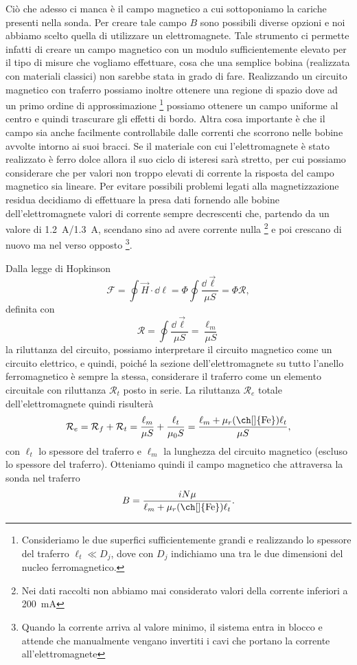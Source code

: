 \documentclass[
    prl,
    reprint, 
    superscriptaddress, 
    altaffilletter, 
    amsmath, 
    amssymb, 
    a4paper,
    varvw]{revtex4-2}
\begin{document}
Ciò che adesso ci manca è il campo magnetico a cui sottoponiamo la cariche presenti nella sonda. Per creare tale campo $B$ sono possibili diverse opzioni e noi abbiamo scelto quella di utilizzare un elettromagnete. Tale strumento ci permette infatti di creare un campo magnetico con un modulo sufficientemente elevato per il tipo di misure che vogliamo effettuare, cosa che una semplice bobina (realizzata con materiali classici) non sarebbe stata in grado di fare. Realizzando un circuito magnetico con traferro possiamo inoltre ottenere una regione di spazio dove ad un primo ordine di approssimazione \footnote{Consideriamo le due superfici sufficientemente grandi e realizzando lo spessore del traferro $\ell_t\ll D_j$, dove con $D_j$ indichiamo una tra le due dimensioni del nucleo ferromagnetico.} possiamo ottenere un campo uniforme al centro e quindi trascurare gli effetti di bordo.  Altra cosa importante è che il campo sia anche facilmente controllabile dalle correnti che scorrono nelle bobine avvolte intorno ai suoi bracci. Se il materiale con cui l'elettromagnete è stato realizzato è ferro dolce allora il suo ciclo di isteresi sarà stretto, per cui possiamo considerare che per valori non troppo elevati di corrente la risposta del campo magnetico sia lineare. Per evitare possibili problemi legati alla magnetizzazione residua decidiamo di effettuare la presa dati fornendo alle bobine dell'elettromagnete valori di corrente sempre decrescenti che, partendo da un valore di \SI{1.2}{\ampere}/\SI{1.3}{\ampere}, scendano sino ad avere corrente nulla \footnote{Nei dati raccolti non abbiamo mai considerato valori della corrente inferiori a \SI{200}{\milli\ampere}} e poi crescano di nuovo ma nel verso opposto \footnote{Quando la corrente arriva al valore minimo, il sistema entra in blocco e attende che manualmente vengano invertiti i cavi che portano la corrente all'elettromagnete}. 

Dalla legge di Hopkinson \begin{equation}
    \mathcal{F} = \oint \vec{H} \cdot \dd \ell = \Phi \oint \frac{\dd \vec{\ell}}{\mu S} = \Phi \mathcal{R},
\end{equation} definita con \[
    \mathcal{R} = \oint \frac{\dd \vec{\ell}}{\mu S} = \frac{\ell_m}{\mu S}
\] la riluttanza del circuito, possiamo interpretare il circuito magnetico come un circuito elettrico, e quindi, poiché la sezione dell'elettromagnete su tutto l'anello ferromagnetico è sempre la stessa, considerare il traferro come un elemento circuitale con riluttanza $\mathcal{R}_t$ posto in serie. La riluttanza $\mathcal{R}_e$ totale dell'elettromagnete quindi risulterà \begin{equation}
    \mathcal{R}_e = \mathcal{R}_f + \mathcal{R}_t = \frac{\ell_m}{\mu S} + \frac{\ell_t}{\mu_0 S} = \frac{\ell_m + \mu_r\text{(\ch[]{Fe})}\ell_t}{\mu S},
\end{equation} con $\ell_{t}$ lo spessore del traferro e $\ell_{m}$ la lunghezza del circuito magnetico (escluso lo spessore del traferro). Otteniamo quindi il campo magnetico che attraversa la sonda nel traferro \begin{equation}
    B = \frac{iN\mu}{\ell_m + \mu_r\text{(\ch[]{Fe})}\ell_t}.
\end{equation}
\end{document}
